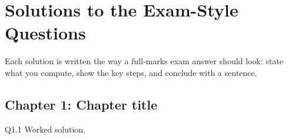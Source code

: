 \clearpage
{}\renewcommand{\tabname}{A}
\chapter{Solutions to the Exam-Style Questions}\label{app:sol}

Each solution is written the way a full-marks exam answer should look: state what you compute,
show the key steps, and conclude with a sentence.

\section{Chapter 1: Chapter title}
\begin{solution}{Q1.1}
Worked solution.
\end{solution}
